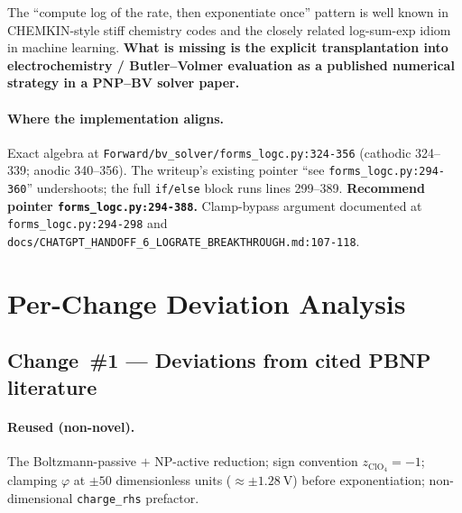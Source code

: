 \documentclass[11pt]{article}
\begin{document}
The ``compute log of the rate, then exponentiate once'' pattern is well
known in CHEMKIN-style stiff chemistry codes and the closely related
log-sum-exp idiom in machine learning. \textbf{What is missing is the
explicit transplantation into electrochemistry / Butler--Volmer evaluation
as a published numerical strategy in a PNP--BV solver paper.}

\paragraph{Where the implementation aligns.}
Exact algebra at \texttt{Forward/bv\_solver/forms\_logc.py:324-356} (cathodic
324--339; anodic 340--356). The writeup's existing pointer ``see
\texttt{forms\_logc.py:294-360}'' undershoots; the full \texttt{if/else} block
runs lines 299--389. \textbf{Recommend pointer
\texttt{forms\_logc.py:294-388}.} Clamp-bypass argument documented at
\texttt{forms\_logc.py:294-298} and
\texttt{docs/CHATGPT\_HANDOFF\_6\_LOGRATE\_BREAKTHROUGH.md:107-118}.

\section{Per-Change Deviation Analysis}

\subsection{Change~\#1 --- Deviations from cited PBNP literature}

\paragraph{Reused (non-novel).}
The Boltzmann-passive $+$ NP-active reduction; sign convention
$z_{\mathrm{ClO}_4}=-1$; clamping $\varphi$ at $\pm 50$ dimensionless units
($\approx \pm\SI{1.28}{\volt}$) before exponentiation; non-dimensional
\texttt{charge\_rhs} prefactor.
\end{document}
